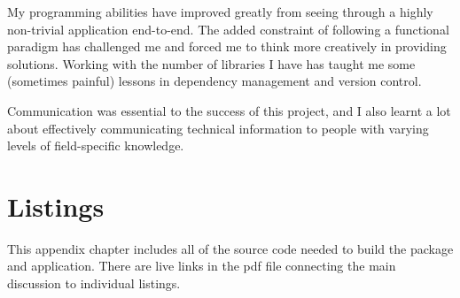 \documentclass[11pt, a4paper, titlepage]{report}
\begin{document}
My programming abilities have improved greatly from seeing through a
highly non-trivial application end-to-end. The added constraint of
following a functional paradigm has challenged me and forced me to
think more creatively in providing solutions. Working with the number
of libraries I have has taught me some (sometimes painful) lessons in
dependency management and version control.

Communication was essential to the success of this project, and I also
learnt a lot about effectively communicating technical information to
people with varying levels of field-specific knowledge.

\appendix
\appendixpage{} \addappheadtotoc{}
\chapter{Listings}\label{cha:appendix}

This appendix chapter includes all of the source code needed to build
the package and application. There are live links in the pdf file
connecting the main discussion to individual listings.




\inputminted[frame=lines,fontsize=\scriptsize,xleftmargin=\parindent,linenos]{R}{R/import-txt.R}

\inputminted[frame=lines,fontsize=\scriptsize,xleftmargin=\parindent,linenos]{R}{R/import-csv.R}

\inputminted[frame=lines,fontsize=\scriptsize,xleftmargin=\parindent,linenos]{R}{R/import-excel.R}

\inputminted[frame=lines,fontsize=\scriptsize,xleftmargin=\parindent,linenos]{R}{R/import-files.R}

\inputminted[frame=lines,fontsize=\scriptsize,xleftmargin=\parindent,linenos]{R}{R/text-prep.R}
\end{document}

